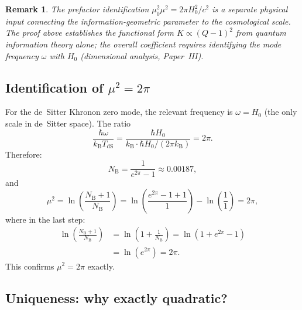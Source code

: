 \documentclass[letterpaper,twocolumn,superscriptaddress,longbibliography]{revtex4-2}
\newtheorem*{remark}{Remark}
\newcommand{\kB}{k_{\mathrm{B}}}
\newcommand{\TdS}{T_{\mathrm{dS}}}
\newcommand{\NB}{N_{\mathrm{B}}}
\begin{document}
\begin{remark}
The prefactor identification
$\mu_0^2 \mu^2 = 2\pi H_0^2/c^2$ is a separate physical input
connecting the information-geometric parameter to the cosmological
scale.  The proof above establishes the \emph{functional form}
$K \propto (Q-1)^2$ from quantum information theory alone;
the overall coefficient requires identifying the mode frequency
$\omega$ with $H_0$ (dimensional analysis, Paper~III).
\end{remark}

\subsection{Identification of $\mu^2 = 2\pi$}

For the de~Sitter Khronon zero mode, the relevant frequency is
$\omega = H_0$ (the only scale in de~Sitter space).
The ratio
\begin{equation}
  \frac{\hbar\omega}{\kB \TdS}
  = \frac{\hbar H_0}{\kB \cdot \hbar H_0/(2\pi\kB)}
  = 2\pi.
  \label{eq:ratio_2pi}
\end{equation}
Therefore:
\begin{equation}
  \NB = \frac{1}{e^{2\pi} - 1} \approx 0.00187,
  \label{eq:NB_value}
\end{equation}
and
\begin{equation}
  \mu^2 = \ln\!\left(\frac{\NB+1}{\NB}\right)
        = \ln\!\left(\frac{e^{2\pi}-1+1}{1}\right)
          - \ln\!\left(\frac{1}{1}\right)
        = 2\pi,
  \label{eq:mu_derivation}
\end{equation}
where in the last step:
\begin{align}
  \ln\!\left(\frac{\NB+1}{\NB}\right)
  &= \ln\!\left(1 + \frac{1}{\NB}\right)
  = \ln\!\left(1 + e^{2\pi} - 1\right)
  \nonumber \\
  &= \ln(e^{2\pi}) = 2\pi.
  \label{eq:mu_exact}
\end{align}
This confirms $\mu^2 = 2\pi$ exactly.

\subsection{Uniqueness: why exactly quadratic?}
\end{document}
